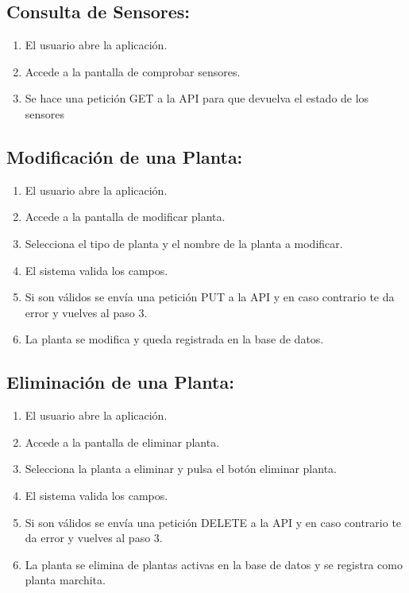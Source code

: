 \subsection{Consulta de Sensores:}
    \begin{enumerate}
        \item {El usuario abre la aplicación.}
        \item {Accede a la pantalla de comprobar sensores.}
        \item {Se hace una petición GET a la API para que devuelva el estado de los sensores}
    \end{enumerate}
\subsection{Modificación de una Planta:}
    \begin{enumerate}
        \item {El usuario abre la aplicación.}
        \item {Accede a la pantalla de modificar planta.}
        \item {Selecciona el tipo de planta y el nombre de la planta a modificar.}
        \item {El sistema valida los campos.}
        \item {Si son válidos se envía una petición PUT a la API y en caso contrario te da error y vuelves al paso 3.}
        \item {La planta se modifica y queda registrada en la base de datos.}
    \end{enumerate}
\subsection{Eliminación de una Planta:}
    \begin{enumerate}
        \item {El usuario abre la aplicación.}
        \item {Accede a la pantalla de eliminar planta.}
        \item {Selecciona la planta a eliminar y pulsa el botón eliminar planta.}
        \item {El sistema valida los campos.}
        \item {Si son válidos se envía una petición DELETE a la API y en caso contrario te da error y vuelves al paso 3.}
        \item {La planta se elimina de plantas activas en la base de datos y se registra como planta marchita.}
    \end{enumerate}